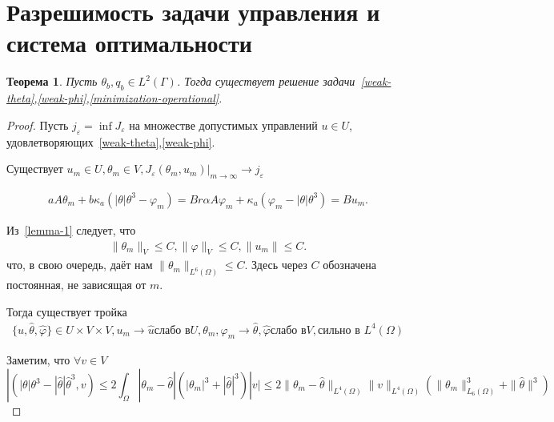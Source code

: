 \documentclass[10pt]{article}
\newtheorem{thm}{\indent Теорема}
\begin{document}
    \section{Разрешимость задачи управления и система оптимальности}\label{sec:solvability-control}
    \begin{thm}
        \label{cp-existing}
        Пусть $\theta_b, q_b \in L^2(\Gamma)$.
        Тогда существует решение
        задачи~\eqref{weak-theta},\eqref{weak-phi},\eqref{minimization-operational}.
    \end{thm}
    \begin{proof}
        Пусть $j_\varepsilon = \inf J_\varepsilon$ на множестве допустимых управлений $u \in U$,
        удовлетворяющих~\eqref{weak-theta},\eqref{weak-phi}.

        Существует $u_m \in U, \theta_m \in V, J_\varepsilon(\theta_m, u_m)|_{m \rightarrow \infty}
        \rightarrow j_\varepsilon $

        \begin{gather}
            \label{theorem-1-operational}
            a A \theta_m +b \kappa_a(|\theta|\theta^3 - \varphi_m) = Br
            \alpha A \varphi_m + \kappa_a (\varphi_m - |\theta|\theta^3) = B u_m.
        \end{gather}


        Из~\ref{lemma-1} следует, что
        \begin{gather*}
            \|\theta_m\|_V \leq C,
            \|\varphi\|_V \leq C,
            \|u_m\| \leq C.
        \end{gather*}
        что, в свою очередь, даёт нам $\|\theta_m\|_{L^6(\Omega)} \leq C.$
        Здесь через $C$ обозначена постоянная, не зависящая от $m$.

        Тогда существует тройка
        \begin{gather*}
            \label{theorem-1-convergence}
            \{ \hat{u}, \hat{\theta}, \hat{\varphi} \} \in U \times V \times V,
            u_m \rightarrow \hat{u} \text{слабо в} U,
            \theta_m, \varphi_m \rightarrow \hat{\theta}, \hat{\varphi} \text{слабо в} V, \text{сильно в } L^4(\Omega)
        \end{gather*}

        Заметим, что $\forall v \in V$
        \begin{equation}
            \label{theorem-1-est}
            |( |\theta|\theta^3 - |\hat{\theta}|\hat{\theta}^3, v) \leq
            2 \int_\Omega |\theta_m - \hat{\theta}| (|\theta_m|^3 + |\hat{\theta}|^3)|v| \leq
            2 \| \theta_m - \hat{\theta}\|_{L^4(\Omega)} \|v\|_{L^4(\Omega)}
            ( \| \theta_m \|^3_{L_6(\Omega)} + \| \hat{\theta} \|^3)
        \end{equation}


\end{proof}
\end{document}
